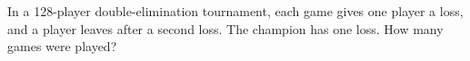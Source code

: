In a 128-player double-elimination tournament, each game gives one player a loss, and a player leaves after a second loss. The champion has one loss. How many games were played?
